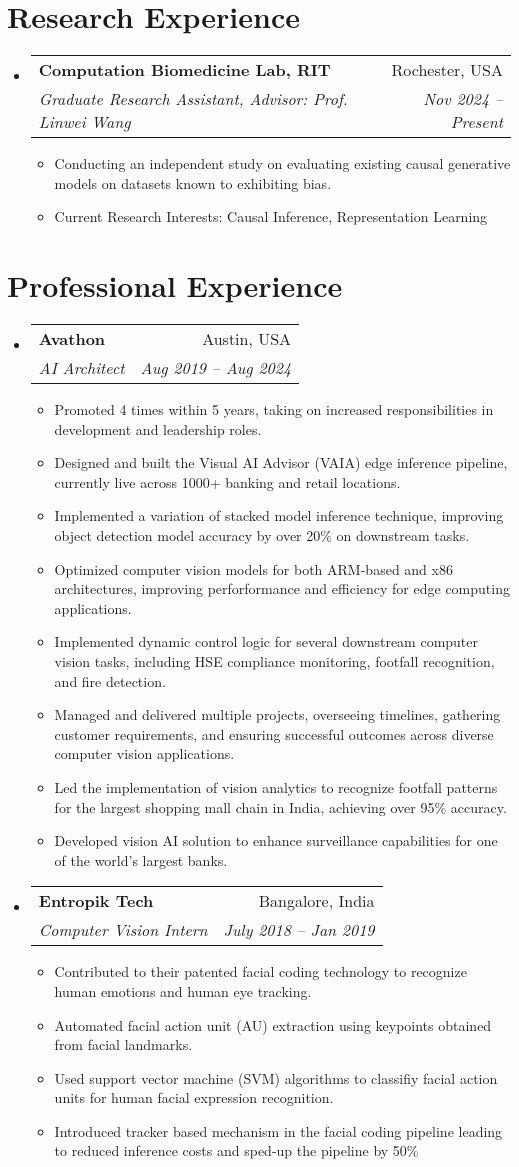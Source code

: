 \documentclass[letterpaper,10pt]{article}
\makeatletter
\newcommand{\resumeItem}[1]{
  \item\small{
    {#1 \vspace{-2pt}}
  }
}
\newcommand{\resumeSubheading}[4]{
  \vspace{-2pt}\item
    \begin{tabular*}{0.97\textwidth}[t]{l@{\extracolsep{\fill}}r}
      \textbf{#1} & #2 \\
      \textit{\small#3} & \textit{\small #4} \\
    \end{tabular*}\vspace{-7pt}
}
\newcommand{\resumeSubHeadingListStart}{\begin{itemize}[leftmargin=0.15in, label={}]}
\newcommand{\resumeSubHeadingListEnd}{\end{itemize}}
\newcommand{\resumeItemListStart}{\begin{itemize}}
\newcommand{\resumeItemListEnd}{\end{itemize}\vspace{-5pt}}
\makeatother
\begin{document}
\section{Research Experience}
  \resumeSubHeadingListStart
    \resumeSubheading
        {Computation Biomedicine Lab, RIT}{Rochester, USA}
        {Graduate Research Assistant, Advisor: Prof. Linwei Wang}{Nov 2024 -- Present}  
          \resumeItemListStart
            \resumeItem{Conducting an independent study on evaluating existing causal generative models on datasets known to exhibiting bias.}
            \resumeItem{Current Research Interests: Causal Inference, Representation Learning}
          \resumeItemListEnd
  \resumeSubHeadingListEnd

\section{Professional Experience}
  \resumeSubHeadingListStart
    \resumeSubheading
      {Avathon}{Austin, USA}
      {AI Architect}{Aug 2019 -- Aug 2024}
      \resumeItemListStart
        \resumeItem{Promoted 4 times within 5 years, taking on increased responsibilities in development and leadership roles.}
        \resumeItem{Designed and built the Visual AI Advisor (VAIA) edge inference pipeline, currently live across 1000+ banking and retail locations.}
        \resumeItem{Implemented a variation of stacked model inference technique, improving object detection model accuracy by over 20\% on downstream tasks.}
        \resumeItem{Optimized computer vision models for both ARM-based and x86 architectures, improving perforformance and efficiency for edge computing applications.}
        \resumeItem{Implemented dynamic control logic for several downstream computer vision tasks, including HSE compliance monitoring, footfall recognition, and fire detection.}
        \resumeItem{Managed and delivered multiple projects, overseeing timelines, gathering customer requirements, and ensuring successful outcomes across diverse computer vision applications.}
        \resumeItem{Led the implementation of vision analytics to recognize footfall patterns for the largest shopping mall chain in India, achieving over 95\% accuracy.}
        \resumeItem{Developed vision AI solution to enhance surveillance capabilities for one of the world's largest banks.}
      \resumeItemListEnd

      \resumeSubheading
      {Entropik Tech}{Bangalore, India}
      {Computer Vision Intern}{July 2018 -- Jan 2019}
      \resumeItemListStart
        \resumeItem{Contributed to their patented facial coding technology to recognize human emotions and human eye tracking.}
        \resumeItem{Automated facial action unit (AU) extraction using keypoints obtained from facial landmarks.}
        \resumeItem{Used support vector machine (SVM) algorithms to classifiy facial action units for human facial expression recognition.}
        \resumeItem{Introduced tracker based mechanism in the facial coding pipeline leading to reduced inference costs and sped-up the pipeline by 50\%}
      \resumeItemListEnd
  \resumeSubHeadingListEnd
\end{document}
